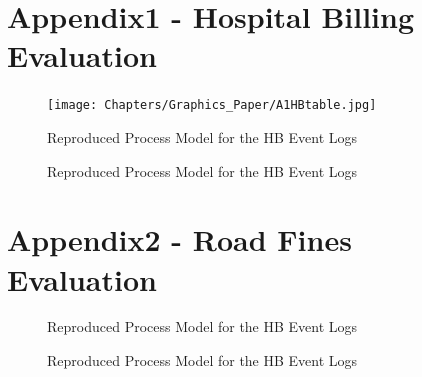 \section{Appendix1 - Hospital Billing Evaluation}

\begin{figure}[H]
\texttt{[image: Chapters/Graphics\_Paper/A1HBtable.jpg]}
\caption{Reproduced Process Model for the HB Event Logs} 
\end{figure}

\begin{figure}[H]
\caption{Reproduced Process Model for the HB Event Logs} 
\end{figure}

\section{Appendix2 - Road Fines Evaluation}

\begin{figure}[H]
\caption{Reproduced Process Model for the HB Event Logs} 
\end{figure}

\begin{figure}[H]
\caption{Reproduced Process Model for the HB Event Logs} 
\end{figure}